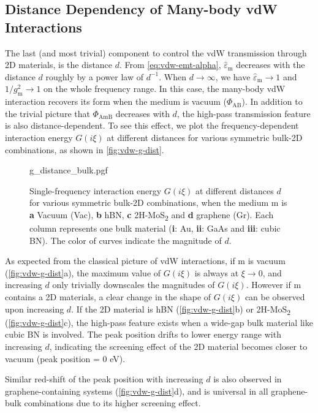 \subsection{Distance Dependency of Many-body vdW Interactions}
\label{sec:vdw-distance}

The last (and most trivial) component to control the vdW transmission
through 2D materials, is the distance $d$.  From
\autoref{eq:vdw-emt-alpha}, \(\hat{\varepsilon}_{\mathrm{m}}\)
decreases with the distance \(d\) roughly by a power law of
\(d^{-1}\). When \(d \to \infty\), we have
\(\hat{\varepsilon}_{\mathrm{m}} \to 1\) and
\(1/g_{\mathrm{m}}^{2} \to 1\) on the whole frequency range. In this
case, the many-body vdW interaction recovers its form when the medium
is vacuum ($\Phi_{\mathrm{AB}}$).
%
In addition to the trivial picture that $\Phi_{\mathrm{AmB}}$
decreases with $d$, the high-pass transmission feature is also
distance-dependent.
%
To see this effect, we plot the frequency-dependent interaction energy
\(G(i \xi)\) at different distances for various symmetric bulk-2D
combinations, as shown in \autoref{fig:vdw-g-dist}.
%
\begin{figure}[!htbp]
  \centering
  {g_distance_bulk.pgf}
  \caption{\label{fig:vdw-g-dist}%
    Single-frequency interaction energy $G(i\xi)$ at different
    distances $d$ for various symmetric bulk-2D combinations, when the
    medium m is \textbf{a} Vacuum (Vac), \textbf{b} hBN, \textbf{c}
    2H-MoS\textsubscript{2} and \textbf{d} graphene (Gr).  Each column
    represents one bulk material (\textbf{i}: Au, \textbf{ii}: GaAs
    and \textbf{iii}: cubic BN). The color of curves indicate the
    magnitude of $d$.  }
\end{figure}

As expected from the classical picture of vdW interactions, if m is
vacuum (\autoref{fig:vdw-g-dist}a), the maximum value of $G(i \xi)$ is
always at $\xi \to 0$, and increasing $d$ only trivially down\-scales
the magnitudes of $G(i \xi)$.
%
However if m contains a 2D materials, a clear change in the shape of
\(G(i \xi)\) can be observed upon increasing $d$.
%
If the 2D material is hBN (\autoref{fig:vdw-g-dist}b) or
2H-MoS\textsubscript{2} (\autoref{fig:vdw-g-dist}c), the high-pass
feature exists when a wide-gap bulk material like cubic BN is
involved. The peak position drifts to lower energy range with
increasing $d$, indicating the screening effect of the 2D material
becomes closer to vacuum (peak position = 0 eV).

Similar red-shift of the peak position with increasing \(d\) is also
observed in graphene-containing systems (\autoref{fig:vdw-g-dist}d),
and is universal in all graphene-bulk combinations due to its higher
screening effect.




